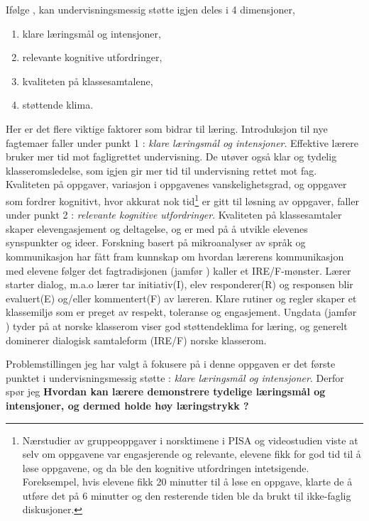 \documentclass[main.tex]{subfiles}
\begin{document}
Ifølge , kan undervisningsmessig støtte igjen deles i 4 dimensjoner,
\begin{enumerate}
\item klare læringsmål og intensjoner,
\item relevante kognitive utfordringer,
\item kvaliteten på klassesamtalene,
\item støttende klima.
\end{enumerate}
Her er det flere viktige faktorer som bidrar til læring. Introduksjon til nye fagtemaer faller 
under punkt 1 : \emph{klare læringsmål og intensjoner}. Effektive lærere bruker mer tid mot 
fagligrettet undervisning. De utøver også klar og tydelig klasseromsledelse, som igjen gir mer tid 
til undervisning rettet mot fag. Kvaliteten på oppgaver, variasjon i oppgavenes vanskelighetsgrad, 
og oppgaver som fordrer kognitivt, hvor akkurat nok tid\footnote{
Nærstudier av gruppeoppgaver i norsktimene i PISA og videostudien  viste at selv om 
oppgavene var engasjerende og relevante, elevene fikk for god tid til å løse oppgavene, og da ble 
den kognitive utfordringen intetsigende. Foreksempel, hvis elevene fikk 20 minutter til å løse en 
oppgave, klarte de å utføre det på 6 minutter og den resterende tiden ble da brukt til ikke-faglig 
diskusjoner.} 
er gitt til løsning av oppgaver, faller under punkt 2 : \emph{relevante kognitive utfordringer}. 
Kvaliteten på klassesamtaler skaper elevengasjement og deltagelse, og er med på å 
utvikle elevenes synspunkter og ideer. Forskning basert på mikroanalyser av språk og kommunikasjon 
har fått fram kunnskap om hvordan lærerens kommunikasjon med elevene følger det fagtradisjonen 
(jamfør ) kaller et IRE/F-mønster. Lærer starter dialog, m.a.o lærer tar 
initiativ(I), elev responderer(R) og responsen blir evaluert(E) og/eller kommentert(F) av læreren.
Klare rutiner og regler skaper et klassemiljø som er preget av respekt, toleranse og engasjement. 
Ungdata (jamfør ) tyder på at norske klasserom viser god støttendeklima for læring, 
og generelt dominerer dialogisk samtaleform (IRE/F) norske klasserom.
\newline

Problemstillingen jeg har valgt å fokusere på i denne oppgaven er det første punktet i 
undervisningsmessig støtte : \emph{klare læringsmål og intensjoner}. Derfor spør jeg 
\newline
\newline
\textbf{Hvordan kan lærere demonstrere tydelige læringsmål og intensjoner, og dermed holde høy
læringstrykk ?}
\newline
\end{document}
